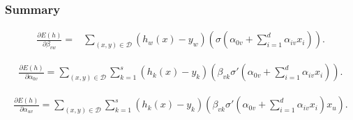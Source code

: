 \begin{frame}
  \frametitle{Summary}

  {\tiny
    \begin{align} 
        \frac{\partial E(h)}{\partial \beta_{v w}} 
        = & %
        \sum_{(x,y) \in \mathcal{D}}
        \left(h_w(x) - y_w \right)
        \left(
            \sigma
            \left(  
                \alpha_{0 v} +
                \sum_{i=1}^d \alpha_{i v}x_i
            \right)
        \right).
    \end{align}

    
    \begin{align} 
        \frac{\partial E(h)}{\partial \alpha_{0 v}} 
        =  %
        \sum_{(x,y) \in \mathcal{D}}
        \sum_{k = 1}^s 
        \left(h_k(x) - y_k \right)
        \left(
            \beta_{v k}
            \sigma '
            \left(  
                \alpha_{0 v} +
                \sum_{i=1}^d \alpha_{i v}x_i
            \right)   
        \right). 
    \end{align}

    
    \begin{align} 
        \frac{\partial E(h)}{\partial \alpha_{u v}} 
        =
        \sum_{(x,y) \in \mathcal{D}}
        \sum_{k = 1}^s 
        \left(h_k(x) - y_k\right)
        \left(
            \beta_{v k}
            \sigma '
            \left(  
                \alpha_{0 v} +
                \sum_{i=1}^d \alpha_{i v}x_i
            \right)x_u   
        \right).
    \end{align}
  }

\end{frame}